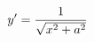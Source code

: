\documentclass[preview]{standalone}
\begin{document}
\begin{align*}
\special{dvisvgm:raw <g id='unique000'>}y'=\dfrac{1}{\sqrt{x^2+a^2}}\special{dvisvgm:raw </g>}
\end{align*}
\end{document}
